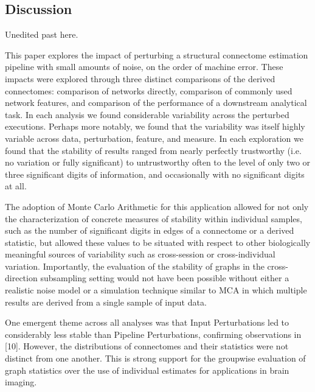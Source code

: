 \documentclass[fleqn,10pt]{SelfArx} %
\begin{document}
\subsection*{Discussion}


{\color{red} Unedited past here}.

This paper explores the impact of perturbing a structural connectome estimation pipeline with small amounts of noise, on the order of machine error. These impacts were explored through three distinct comparisons of the derived connectomes: comparison of networks directly, comparison of commonly used network features, and comparison of the performance of a downstream analytical task. In each analysis we found considerable variability across the perturbed executions. Perhaps more notably, we found that the variability was itself highly variable across data, perturbation, feature, and measure. In each exploration we found that the stability of results ranged from nearly perfectly trustworthy (i.e. no variation or fully significant) to untrustworthy often to the level of only two or three significant digits of information, and occasionally with no significant digits at all.

The adoption of Monte Carlo Arithmetic for this application allowed for not only the characterization of concrete measures of stability within individual samples, such as the number of significant digits in edges of a connectome or a derived statistic, but allowed these values to be situated with respect to other biologically meaningful sources of variability such as cross-session or cross-individual variation. Importantly, the evaluation of the stability of graphs in the cross-direction subsampling setting would not have been possible without either a realistic noise model or a simulation technique similar to MCA in which multiple results are derived from a single sample of input data.


One emergent theme across all analyses was that Input Perturbations led to considerably less stable than Pipeline Perturbations, confirming observations in [10]. However, the distributions of connectomes and their statistics were not distinct from one another. This is strong support for the groupwise evaluation of graph statistics over the use of individual estimates for applications in brain imaging.
\end{document}
